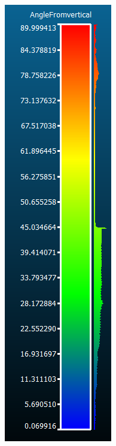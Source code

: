 \documentclass[11pt,a4paper]{article}
\begin{document}
	\begin{minipage}{.1 \textwidth}
		\begin{figure}[H]
			
			\includegraphics[width=1\linewidth]{./Lrdgend}
		\end{figure}

	\end{minipage}
	
\end{document}

